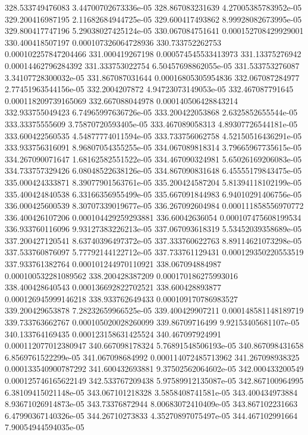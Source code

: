 {328.533749476083 3.44700702673336e-05
328.867083231639 4.27005385783952e-05
329.200416987195 2.11682684944725e-05
329.600417493862 8.99928082673995e-05
329.800417747196 5.29038027425124e-05
330.067084751641 0.000152708429929001
330.400418507197 0.000107326064728936
330.733752262753 0.000102257847204466
331.000419267198 0.000574545533413973
331.13375276942 0.00014462796284392
331.333753022754 6.50457698862055e-05
331.533753276087 3.34107728300032e-05
331.867087031644 0.00016805305954836
332.067087284977 2.77451963544156e-05
332.2004207872 4.94723073149053e-05
332.467087791645 0.000118209739165069
332.667088044978 0.000140506428843214
332.933755049423 6.74965997636726e-05
333.200422053868 2.6325852655544e-05
333.33375555609 3.75870720593405e-05
333.467089058313 4.89307726544181e-05
333.600422560535 4.54877774011594e-05
333.733756062758 4.52150516436291e-05
333.933756316091 8.96807054355255e-05
334.067089818314 3.79665967735615e-05
334.267090071647 1.68162582551522e-05
334.467090324981 5.65026169206083e-05
334.733757329426 6.08048522638126e-05
334.867090831648 6.45555179843475e-05
335.000424333871 8.39077901563761e-05
335.200424587204 5.81394118102199e-05
335.400424840538 6.33166356955499e-05
335.667091844983 6.94010291406756e-05
336.000425600539 8.30707339019677e-05
336.267092604984 0.000111858556970772
336.400426107206 0.000104429259293881
336.60042636054 0.000107475608199534
336.933760116096 9.93127383226213e-05
337.067093618319 5.53452039358689e-05
337.200427120541 8.63740396497372e-05
337.333760622763 8.89114621073298e-05
337.533760876097 5.77792144122712e-05
337.733761129431 0.000129350220553519
337.933761382764 0.000101244970110921
338.067094884987 0.000100532281089562
338.200428387209 0.000170186275993016
338.400428640543 0.000136692822702521
338.600428893877 0.000126945999146218
338.933762649433 0.000109170786983527
339.200429653878 7.28232659966525e-05
339.400429907211 0.000148581148189719
339.733763662767 0.000105020028260099
339.86709716499 9.92153405681107e-05
340.133764169435 0.000123158631425524
340.467097924991 0.000112077012380947
340.667098178324 5.76891548506193e-05
340.867098431658 6.8569761522299e-05
341.067098684992 0.000114072485713962
341.267098938325 0.000133540900787292
341.600432693881 9.37502562064602e-05
342.000433200549 0.000125746165622149
342.533767209438 5.97589912135087e-05
342.867100964995 6.38109415021148e-05
343.067101218328 3.5858408741581e-05
343.400434973884 8.93671026914873e-05
343.73376872944 8.00683072410409e-05
343.867102231663 6.47990367140326e-05
344.26710273833 4.35270897075497e-05
344.467102991664 7.90054944594035e-05
}
